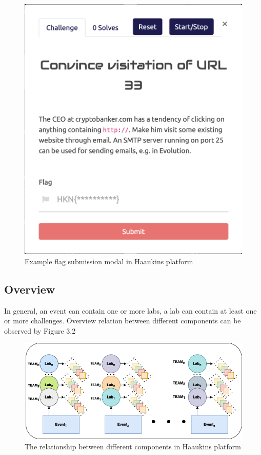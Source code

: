  
 \begin{figure}[htbp]
\centerline{\includegraphics[scale=.4]{figures/flag-submission-modal.png}}
\caption{Example flag submission modal in Haaukins platform}
\label{fig}
\end{figure}
\newpage
\subsection{Overview}
 In general, an event can contain one or more labs, a lab can contain at least one or more challenges. Overview relation between different components can be observed by Figure 3.2
 
\begin{figure}[htbp]
\centerline{\includegraphics[scale=.5]{figures/relationship-diagram.png}}
\caption{The relationship between different components in Haaukins platform}
\label{fig}
\end{figure}
 
